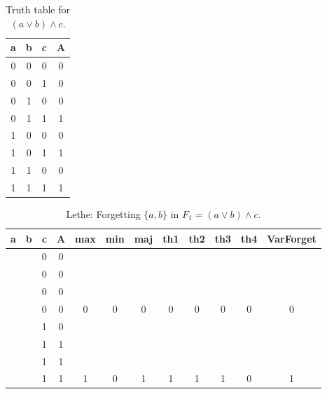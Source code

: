 \begin{table}[!tb]
    \centering
    \begin{tabular}{|c|c|c|c|}
        \hline
        \textbf{a} & \textbf{b} & \textbf{c} & \textbf{A} \\ \hline
        0 & 0 & 0 & 0 \\ \hline
        0 & 0 & 1 & 0 \\ \hline
        0 & 1 & 0 & 0 \\ \hline
        0 & 1 & 1 & 1 \\ \hline
        1 & 0 & 0 & 0 \\ \hline
        1 & 0 & 1 & 1 \\ \hline
        1 & 1 & 0 & 0 \\ \hline
        1 & 1 & 1 & 1 \\ \hline
    \end{tabular}
    \caption{Truth table for $(a \lor b) \land c$.}
    \label{tab:truthtab}
\end{table}

\begin{table}[!tb]
    \centering
    \begin{tabular}{|c|c|c|c|c|c|c|c|c|c|c|c|}
        \hline
        \textbf{a} & \textbf{b} & \textbf{c} & \textbf{A} & \textbf{max} & \textbf{min} & \textbf{maj} & \textbf{th1} & \textbf{th2} & \textbf{th3} & \textbf{th4} & \textbf{VarForget} \\ \hline
        \rowcolor{gray!40}  &  & 0 & 0 &  &  &  &  &  &  &  &  \\ \hline
        \rowcolor{gray!40}  &  & 0 & 0 &  &  &  &  &  &  &  &  \\ \hline
        \rowcolor{gray!40}  &  & 0 & 0 &  &  &  &  &  &  &  &  \\ \hline
        \rowcolor{gray!40}  &  & 0 & 0 & 0 & 0 & 0 & 0 & 0 & 0 & 0 & 0 \\ \hline
        \rowcolor{blue!40}  &  & 1 & 0 &  &  &  &  &  &  &  &  \\ \hline
        \rowcolor{blue!40}  &  & 1 & 1 &  &  &  &  &  &  &  &  \\ \hline
        \rowcolor{blue!40}  &  & 1 & 1 &  &  &  &  &  &  &  &  \\ \hline
        \rowcolor{blue!40}  &  & 1 & 1 & 1 & 0 & 1 & 1 & 1 & 1 & 0 & 1 \\ \hline
    \end{tabular}
    \caption{Lethe: Forgetting $\{a, b\}$ in $F_{1} = (a \lor b) \land c$.}
    \label{tab:lethe-F1-ab}
\end{table}
